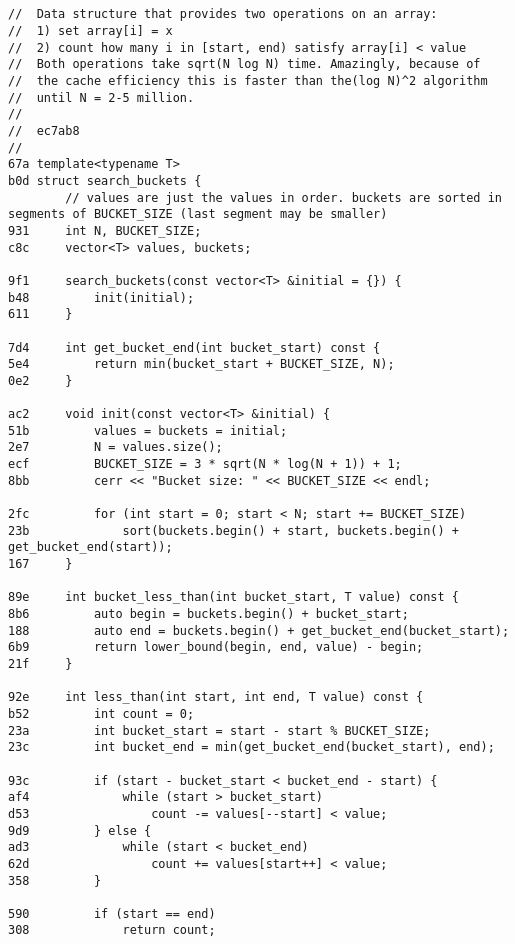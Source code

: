 \documentclass[11pt, a4paper, twoside]{article}
\begin{document}
\subsection{ }
\begin{lstlisting}
//  Data structure that provides two operations on an array:
//  1) set array[i] = x
//  2) count how many i in [start, end) satisfy array[i] < value
//  Both operations take sqrt(N log N) time. Amazingly, because of 
//  the cache efficiency this is faster than the(log N)^2 algorithm 
//  until N = 2-5 million.
//  
//  ec7ab8
//
67a template<typename T>
b0d struct search_buckets {
        // values are just the values in order. buckets are sorted in segments of BUCKET_SIZE (last segment may be smaller)
931     int N, BUCKET_SIZE;
c8c     vector<T> values, buckets;
    
9f1     search_buckets(const vector<T> &initial = {}) {
b48         init(initial);
611     }
    
7d4     int get_bucket_end(int bucket_start) const {
5e4         return min(bucket_start + BUCKET_SIZE, N);
0e2     }
    
ac2     void init(const vector<T> &initial) {
51b         values = buckets = initial;
2e7         N = values.size();
ecf         BUCKET_SIZE = 3 * sqrt(N * log(N + 1)) + 1;
8bb         cerr << "Bucket size: " << BUCKET_SIZE << endl;
    
2fc         for (int start = 0; start < N; start += BUCKET_SIZE)
23b             sort(buckets.begin() + start, buckets.begin() + get_bucket_end(start));
167     }
    
89e     int bucket_less_than(int bucket_start, T value) const {
8b6         auto begin = buckets.begin() + bucket_start;
188         auto end = buckets.begin() + get_bucket_end(bucket_start);
6b9         return lower_bound(begin, end, value) - begin;
21f     }
    
92e     int less_than(int start, int end, T value) const {
b52         int count = 0;
23a         int bucket_start = start - start % BUCKET_SIZE;
23c         int bucket_end = min(get_bucket_end(bucket_start), end);
    
93c         if (start - bucket_start < bucket_end - start) {
af4             while (start > bucket_start)
d53                 count -= values[--start] < value;
9d9         } else {
ad3             while (start < bucket_end)
62d                 count += values[start++] < value;
358         }
    
590         if (start == end)
308             return count;
    

\end{lstlisting}
\end{document}
